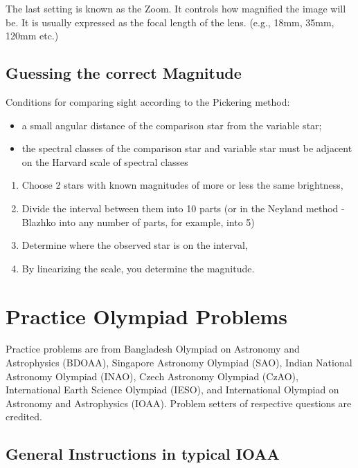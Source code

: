 \documentclass[a4paper,12pt]{extarticle}
\begin{document}
The last setting is known as the Zoom. It controls how magnified the image will be. It is usually expressed as the focal length of the lens. (e.g., 18mm, 35mm, 120mm etc.)

\subsection{Guessing the correct Magnitude}

Conditions for comparing sight according to the Pickering method:
\begin{itemize}
	\itemsep0em
	\item a small angular distance of the comparison star from the variable star;
	\item the spectral classes of the comparison star and variable star must be adjacent on the Harvard scale of spectral classes
\end{itemize}

\begin{enumerate}
	\itemsep0em 
	\item Choose 2 stars with known magnitudes of more or less the same brightness,
	\item  Divide the interval between them into 10 parts (or in the Neyland method - Blazhko into any number of parts, for example, into 5)
	\item Determine where the observed star is on the interval,
	\item By linearizing the scale, you determine the magnitude.
\end{enumerate}


\clearpage
\section{Practice Olympiad Problems}
\begin{defi}
Practice problems are from Bangladesh Olympiad on Astronomy and Astrophysics (BDOAA), Singapore Astronomy Olympiad (SAO), Indian National Astronomy Olympiad (INAO), Czech Astronomy Olympiad (CzAO), International Earth Science Olympiad (IESO), and International Olympiad on Astronomy and Astrophysics (IOAA). Problem setters of respective questions are credited. 	
\end{defi}

\subsection{General Instructions in typical IOAA}
\end{document}
